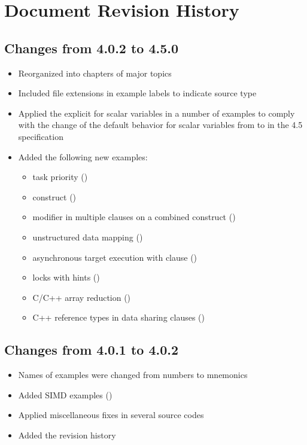 \chapter{Document Revision History}
\label{chap:history}

\section{Changes from 4.0.2 to 4.5.0}
\begin{itemize}
\item Reorganized into chapters of major topics
\item Included file extensions in example labels to indicate source type
\item Applied the explicit  for scalar variables 
in a number of examples to comply with 
the change of the default behavior for scalar variables from 
 to  in the 4.5 specification
\item Added the following new examples:
\begin{itemize}
\item task priority ()
\item {} construct ()
\item {} modifier in multiple  clauses on
a combined construct ()
\item unstructured data mapping ()
\item asynchronous target execution with  clause ()
\item locks with hints ()
\item C/C++ array reduction ()
\item C++ reference types in data sharing clauses ()
\end{itemize}
\end{itemize}

\section{Changes from 4.0.1 to 4.0.2}

\begin{itemize}
\item Names of examples were changed from numbers to mnemonics
\item Added SIMD examples ()
\item Applied miscellaneous fixes in several source codes
\item Added the revision history
\end{itemize}

